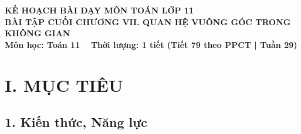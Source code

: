 \documentclass[12pt, a4paper]{article}
\begin{document}
\begin{center}
    {\fontsize{14pt}{17pt}\selectfont \textbf{KẾ HOẠCH BÀI DẠY MÔN TOÁN LỚP 11}}\\[6pt]
    {\fontsize{16pt}{19pt}\selectfont \textbf{BÀI TẬP CUỐI CHƯƠNG VII. QUAN HỆ VUÔNG GÓC TRONG KHÔNG GIAN}}\\[4pt]
    {\fontsize{12pt}{15pt}\selectfont \textbf{Môn học: Toán 11} \ \textbar \ \textbf{Thời lượng: 1 tiết (Tiết 79 theo PPCT | Tuần 29)}}
\end{center}

\vspace{5pt}

\section*{I. MỤC TIÊU}

\subsection*{1. Kiến thức, Năng lực}
\end{document}
